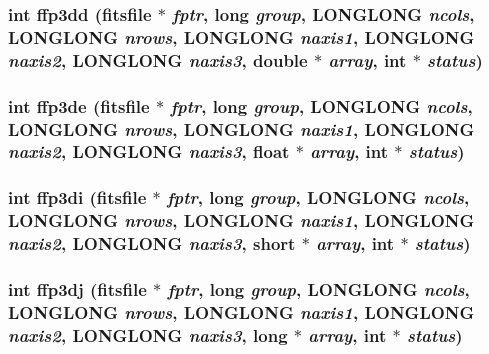 \subsubsection{\setlength{\rightskip}{0pt plus 5cm}int ffp3dd (\bf{fitsfile} $\ast$ {\em fptr}, long {\em group}, \bf{LONGLONG} {\em ncols}, \bf{LONGLONG} {\em nrows}, \bf{LONGLONG} {\em naxis1}, \bf{LONGLONG} {\em naxis2}, \bf{LONGLONG} {\em naxis3}, double $\ast$ {\em array}, int $\ast$ {\em status})}\label{test_2shm__client_2fitsio_8h_07253c7bb04c4b09022517aff697976b}


\subsubsection{\setlength{\rightskip}{0pt plus 5cm}int ffp3de (\bf{fitsfile} $\ast$ {\em fptr}, long {\em group}, \bf{LONGLONG} {\em ncols}, \bf{LONGLONG} {\em nrows}, \bf{LONGLONG} {\em naxis1}, \bf{LONGLONG} {\em naxis2}, \bf{LONGLONG} {\em naxis3}, float $\ast$ {\em array}, int $\ast$ {\em status})}\label{test_2shm__client_2fitsio_8h_47bab14919cfc2b7d34df2117c7dfdaa}


\subsubsection{\setlength{\rightskip}{0pt plus 5cm}int ffp3di (\bf{fitsfile} $\ast$ {\em fptr}, long {\em group}, \bf{LONGLONG} {\em ncols}, \bf{LONGLONG} {\em nrows}, \bf{LONGLONG} {\em naxis1}, \bf{LONGLONG} {\em naxis2}, \bf{LONGLONG} {\em naxis3}, short $\ast$ {\em array}, int $\ast$ {\em status})}\label{test_2shm__client_2fitsio_8h_61b77356b3271c147b6d8cef61a762ab}


\subsubsection{\setlength{\rightskip}{0pt plus 5cm}int ffp3dj (\bf{fitsfile} $\ast$ {\em fptr}, long {\em group}, \bf{LONGLONG} {\em ncols}, \bf{LONGLONG} {\em nrows}, \bf{LONGLONG} {\em naxis1}, \bf{LONGLONG} {\em naxis2}, \bf{LONGLONG} {\em naxis3}, long $\ast$ {\em array}, int $\ast$ {\em status})}\label{test_2shm__client_2fitsio_8h_282e156fee640697324c7fcb6c5f1edf}


